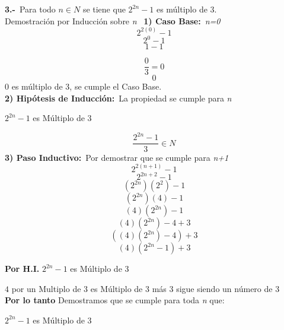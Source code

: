 \textbf{3.-}\ Para todo $n \in N$ se tiene que $2^{2n} -1 $ es múltiplo de $3$.\\
\newline
Demostración por Inducción sobre \textit{n}\
\newline
\textbf{1) Caso Base:}\ \textit{n=0}\
\[
2^{2(0)}-1
\]
\[
2^{0}-1
\]
\[
1-1
\]

\[
\frac{0}{3} = 0
\]
\[
0
\]
\newline
$0$ es múltiplo de 3, se cumple el Caso Base.\\
\newline
\textbf{2) Hipótesis de Inducción:}\  La propiedad se cumple para \textit{n}\
\begin{center}
$2^{2n}-1$ es Múltiplo de 3
\end{center}
\[
\frac{2^{2n} - 1}{3} \in N
\]
\textbf{3) Paso Inductivo:}\  Por demostrar que se cumple para \textit{n+1}\
\[
2^{2(n+1)} - 1
\]
\[
2^{2n+2} -1
\]
\[
(2^{2n})(2^{2}) - 1
\]
\[
(2^{2n})(4) - 1 
\]
\[
(4)(2^{2n}) - 1
\]
\[
(4)(2^{2n}) - 4 + 3
\]
\[
((4)(2^{2n}) - 4) +3
\]
\[
(4)(2^{2n}-1) + 3
\]
\begin{center}
\textbf{Por H.I.} $2^{2n}-1$ es Múltiplo de 3
\end{center}
$4$ por un Multiplo de 3 es Múltiplo de 3 más 3 sigue siendo un número de 3\\
\newline
\textbf{Por lo tanto} Demostramos que se cumple para toda \textit{n} que: 
\begin{center}
$2^{2n}-1$ es Múltiplo de 3
\end{center}

